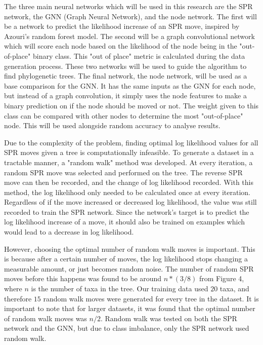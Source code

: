 \documentclass{mpaper}
\begin{document}
The three main neural networks which will be used in this research are the SPR network, the GNN (Graph Neural Network), and the node network. The first will be a network to predict the likelihood increase of an SPR move, inspired by Azouri's random forest model. The second will be a graph convolutional network which will score each node based on the likelihood of the node being in the "out-of-place" binary class. This "out of place" metric is calculated during the data generation process. These two networks will be used to guide the algorithm to find phylogenetic trees. The final network, the node network, will be used as a base comparison for the GNN. It has the same inputs as the GNN for each node, but instead of a graph convolution, it simply uses the node features to make a binary prediction on if the node should be moved or not. The weight given to this class can be compared with other nodes to determine the most "out-of-place" node. This will be used alongside random accuracy to analyse results.

Due to the complexity of the problem, finding optimal log likelihood values for all SPR moves given a tree is computationally infeasible. To generate a dataset in a tractable manner, a "random walk" method was developed. At every iteration, a random SPR move was selected and performed on the tree. The reverse SPR move can then be recorded, and the change of log likelihood recorded. With this method, the log likelihood only needed to be calculated once at every iteration. Regardless of if the move increased or decreased log likelihood, the value was still recorded to train the SPR network. Since the network's target is to predict the log likelihood increase of a move, it should also be trained on examples which would lead to a decrease in log likelihood.

However, choosing the optimal number of random walk moves is important. This is because after a certain number of moves, the log likelihood stops changing a measurable amount, or just becomes random noise. The number of random SPR moves before this happens was found to be around $n*(3/8)$ from Figure 4, where $n$ is the number of taxa in the tree. Our training data used $20$ taxa, and therefore $15$ random walk moves were generated for every tree in the dataset. It is important to note that for larger datasets, it was found that the optimal number of random walk moves was $n/2$. Random walk was tested on both the SPR network and the GNN, but due to class imbalance, only the SPR network used random walk.
\end{document}
